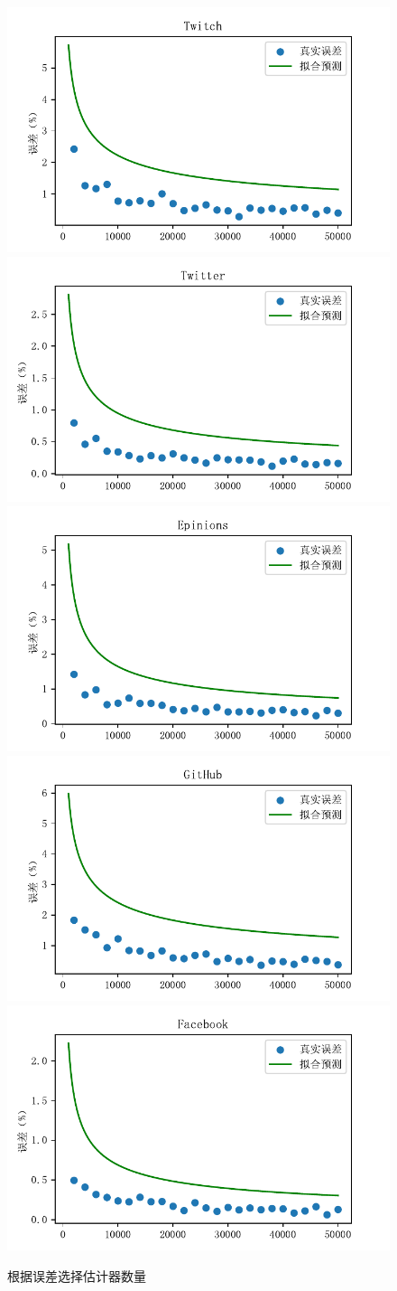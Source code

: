 \documentclass[master]{thesis-uestc}
\begin{document}
\begin{figure}
    \includegraphics[width=0.5\linewidth]{pic/en/Twitch.pdf}\\
    \includegraphics[width=0.5\linewidth]{pic/en/Twitter.pdf}%
    \includegraphics[width=0.5\linewidth]{pic/en/Epinions.pdf}\\
    \includegraphics[width=0.5\linewidth]{pic/en/GitHub.pdf}%
    \includegraphics[width=0.5\linewidth]{pic/en/Facebook.pdf}
    \caption{根据误差选择估计器数量}
    \label{fig:en-elp}
\end{figure}
\end{document}
